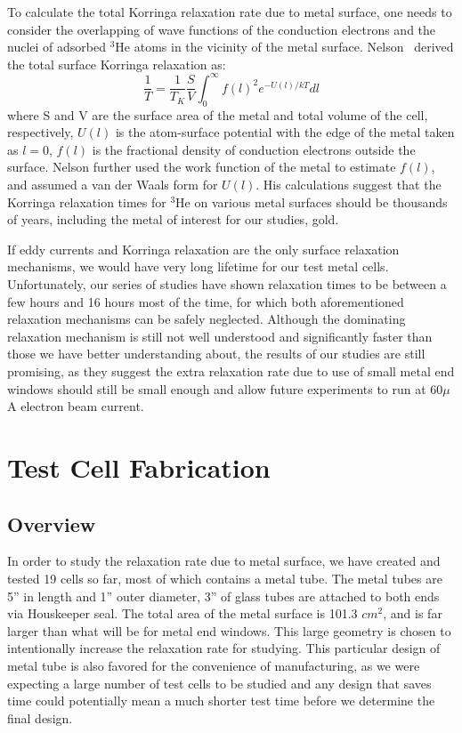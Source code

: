 To calculate the total Korringa relaxation rate due to metal surface, one needs to consider the overlapping of wave functions of the conduction electrons and the nuclei of adsorbed $^{3}$He atoms in the vicinity of the metal surface. Nelson~\cite{NelsonThesis} derived the total surface Korringa relaxation as:
\begin{equation}
\frac{1}{T}=\frac{1}{T_K}\frac{S}{V}\int_{0}^{\infty} f\left(l\right)^2 e^{-U\left(l\right)/kT}dl
\end{equation}
where S and V are the surface area of the metal and total volume of the cell, respectively, $U\left(l\right)$ is the atom-surface potential with the edge of the metal taken as $l=0$, $f\left(l\right)$ is the fractional density of conduction electrons outside the surface. Nelson further used the work function of the metal to estimate $f\left(l\right)$, and assumed a van der Waals form for $U\left(l\right)$. His calculations suggest that the Korringa relaxation times for $^{3}$He on various metal surfaces should be thousands of years, including the metal of interest for our studies, gold.

If eddy currents and Korringa relaxation are the only surface relaxation mechanisms, we would have very long lifetime for our test metal cells. Unfortunately, our series of studies have shown relaxation times to be between a few hours and 16 hours most of the time, for which both aforementioned relaxation mechanisms can be safely neglected. Although the dominating relaxation mechanism is still not well understood and significantly faster than those we have better understanding about, the results of our studies are still promising, as they suggest the extra relaxation rate due to use of small metal end windows should still be small enough and allow future experiments to run at 60$\mu$A electron beam current.

\section{Test Cell Fabrication}

\subsection{Overview}

In order to study the relaxation rate due to metal surface, we have created and tested 19 cells so far, most of which contains a metal tube. The metal tubes are 5'' in length and 1'' outer diameter, 3'' of glass tubes are attached to both ends via Houskeeper seal. The total area of the metal surface is 101.3 $cm^2$, and is far larger than what will be for metal end windows. This large geometry is chosen to intentionally increase the relaxation rate for studying. This particular design of metal tube is also favored for the convenience of manufacturing, as we were expecting a large number of test cells to be studied and any design that saves time could potentially mean a much shorter test time before we determine the final design.

